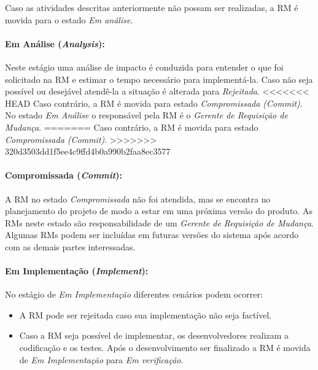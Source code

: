 Caso as atividades descritas anteriormente não possam ser re\-a\-li\-za\-das, a
RM é movida para o estado \textit{Em análise}.

\paragraph{Em Análise (\textit{Analysis}):}\label{par:em_analise}

Neste estágio uma análise de impacto é conduzida para entender o que foi
solicitado na RM e estimar o tempo necessário para implementá-la. Caso não seja
possível ou desejável atendê-la a situação é alterada para \textit{Rejeitada}.
<<<<<<< HEAD
Caso contrário, a RM é movida para estado \textit{Compromissada (Commit)}. No
estado \textit{Em Análise} o responsável pela RM é o \textit{Gerente de
    Requisição de Mudança}.
=======
Caso contrário, a RM é movida para estado \textit{Compromissada (Commit)}.
>>>>>>> 320d3503dd1f5ee4c9ffd4b0a990b2faa8ec3577

\paragraph{Compromissada (\textit{Commit}):}\label{par:commit}

A RM no estado \textit{Compromissada} não foi atendida, mas se encontra no
planejamento do projeto de modo a estar em uma próxima versão do produto. As RMs
neste estado são responsabilidade de um \textit{Gerente de Requisição de
    Mudança}. Algumas RMs podem ser incluídas em futuras versões do sistema após
acordo com as demais partes interessadas.

\paragraph{Em Implementação (\textit{Implement}):}\label{par:em_implementacao}

No estágio de \textit{Em Implementação} diferentes cenários podem ocorrer:

\begin{itemize}
	\item A RM pode ser rejeitada caso sua implementação não seja factível.
    \item Caso a RM seja possível de implementar, os desenvolvedores realizam a
        codificação e os testes. Após o desenvolvimento ser finalizado a RM é
        movida de \textit{Em Implementação} para \textit{Em verificação}.
\end{itemize}

